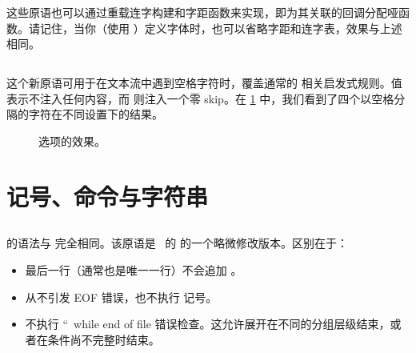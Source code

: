 这些原语也可以通过重载连字构建和字距函数来实现，即为其关联的回调分配哑函数。请记住，当你（使用 \LUA）定义字体时，也可以省略字距和连字表，效果与上述相同。

\subsection{\type{\nospaces}}


这个新原语可用于在文本流中遇到空格字符时，覆盖通常的  相关启发式规则。值  表示不注入任何内容，而  则注入一个零 skip。在 \ref{fig:nospaces} 中，我们看到了四个以空格分隔的字符在不同设置下的结果。

\begin{figure}[htbp]
\centering
{}
\quad
{}
\quad
{}
\caption{ 选项的效果。}\label{fig:nospaces}
\end{figure}

\section{记号、命令与字符串}

\subsection{}


 的语法与  完全相同。该原语是 \ETEX\ 的  的一个略微修改版本。区别在于：

\begin{itemize}\item 最后一行（通常也是唯一一行）不会追加 。

\item {} 从不引发 EOF 错误，也不执行  记号。

\item 不执行 ``\type{\unknown}\ while end of file \type{\unknown} 错误检查。这允许展开在不同的分组层级结束，或者在条件尚不完整时结束。

\end{itemize}

